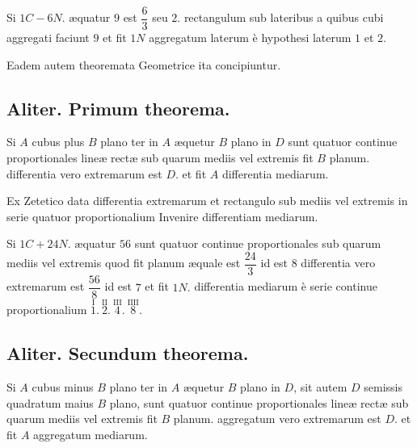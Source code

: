 \documentclass[11pt,a4paper]{article}
\begin{document}
Si $1C - 6N.$ æquatur $9$ est $\dfrac{6}{3}$ seu $2$. rectangulum sub lateribus a quibus cubi aggregati faciunt $9$ et fit $1N$ aggregatum laterum è hypothesi laterum $1$ et $2$.

Eadem autem theoremata Geometrice ita concipiuntur.

\subsection*{Aliter. Primum theorema.}

Si $A$ cubus plus $B$ plano ter in $A$ æquetur $B$ plano in $D$ sunt quatuor continue proportionales lineæ rectæ sub quarum mediis vel extremis fit $B$ planum. differentia vero extremarum est $D$. et fit $A$ differentia mediarum.


Ex Zetetico data differentia extremarum et rectangulo sub mediis vel extremis in serie quatuor proportionalium Invenire differentiam mediarum.

Si $1C + 24N.$ æquatur $56$ sunt quatuor continue proportionales sub quarum mediis vel extremis quod fit planum æquale est $\dfrac{24}{3}$ id est $8$ differentia vero extremarum est $\dfrac{56}{8}$ id est $7$ et fit $1N.$ differentia mediarum è serie continue proportionalium $\overset{\mathrm{I}}{1}.\ \overset{\mathrm{II}}{2}.\ \overset{\mathrm{III}}{4}.\ \overset{\mathrm{IIII}}{8}.$

\subsection*{Aliter. Secundum theorema.}

Si $A$ cubus minus $B$ plano ter in $A$ æquetur $B$ plano in $D$, sit autem $D$ semissis quadratum maius $B$ plano, sunt quatuor continue proportionales lineæ rectæ sub quarum mediis vel extremis fit $B$ planum. aggregatum vero extremarum est $D$. et fit $A$ aggregatum mediarum.
\end{document}
